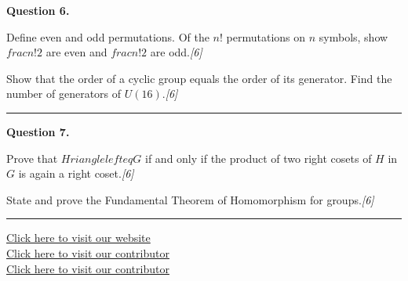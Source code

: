 \documentclass[11pt,a4paper]{article}
\newcommand{\pts}[1]{\hfill   \textit{[#1]}}
\begin{document}
\medskip


\noindent   \textbf{Question 6.}

\begin{parts}
  \item Define even and odd permutations. Of the $n!$ permutations on $n$ symbols, show $ frac{n!}{2}$ are even and $ frac{n!}{2}$ are odd.\pts{6}
  \item Show that the order of a cyclic group equals the order of its generator. Find the number of generators of $U(16)$.\pts{6}
\end{parts}
\medskip\rule{\linewidth}{0.2pt}

\medskip


\noindent   \textbf{Question 7.}

\begin{parts}
  \item Prove that $H rianglelefteq G$ if and only if the product of two right cosets of $H$ in $G$ is again a right coset.\pts{6}
  \item State and prove the Fundamental Theorem of Homomorphism for groups.\pts{6}
\end{parts}

\vfill\rule{\linewidth}{0.4pt}

\begin{center}\small
\href{https://bhu-exam.vercel.app/}{Click here to visit our website}\\[4pt]
\href{https://me-aryan.vercel.app/}{Click here to visit our contributor}\\[4pt]
\href{https://quashan-me.vercel.app/}{Click here to visit our contributor}
\end{center}
\end{document}
